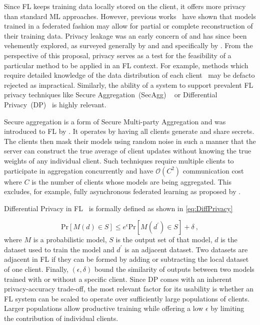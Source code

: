 Since FL keeps training data locally stored on the client, it offers more privacy than standard ML approaches. However, previous works~\citep{InvertingGradients,ProtectionAgainstReconstructionAndItsApplicationsInPrivateFL,PrivacyPreservingDLAdditivelyHomo,DeepLeakage} have shown that models trained in a federated fashion may allow for partial or complete reconstruction of their training data. Privacy leakage was an early concern of \citet{LearningDifferentiallyPrivateRNNs} and has since been vehemently explored, as surveyed generally by \citet{AdvancedAndOpenProblems} and \citet{ChallangesMethodsFutureDirections} and specifically by \citet{AcomprehensiveSurveyOFPrivacyPreservingFL}.
From the perspective of this proposal, privacy serves as a test for the feasibility of a particular method to be applied in an FL context. For example, methods which require detailed knowledge of the data distribution of each client~\citep{FLwithNonIID, OptimalUserEdgeAssingmentHierFL,FedHOME,CommEffDistillation} may be defacto rejected as impractical. Similarly, the ability of a system to support prevalent FL privacy techniques like Secure Aggregation~(SecAgg) ~\citep{SecAggOG,FastSecAgg,LightSecAgg} or Differential Privacy~(DP)~\citep{DiffPrivacyOriginal,DiffPrivacyFL,LearningDifferentiallyPrivateRNNs,TowardsFairPrivacyPreservingFL,PracticalPrivateFLkairouz21b} is highly relevant.


Secure aggregation is a form of Secure Multi-party Aggregation and was introduced to FL by \citet{SecAggOG}. It operates by having all clients generate and share secrets. The clients then mask their models using random noise in such a manner that the server can construct the true average of client updates without knowing the true weights of any individual client. Such techniques require multiple clients to participate in aggregation concurrently and have $\mathcal{O}(C^2)$ communication cost where $C$ is the number of clients whose models are being aggregated. This excludes, for example, fully asynchronous federated learning as proposed by \citet{AsyncFedOpt}.

Differential Privacy in FL~\citep{LearningDifferentiallyPrivateRNNs} is formally defined as shown in \cref{eq:DiffPrivacy}

\begin{equation}\label{eq:DiffPrivacy}
    \mathrm{Pr}[M(d) \in S] \leq e^\epsilon \mathrm{Pr}[M(d^\prime) \in S] + \delta \ ,
\end{equation}
where $M$ is a probabilistic model, $S$ is the output set of that model, $d$ is the dataset used to train the model and $d^\prime$ is an adjacent dataset. Two datasets are adjacent in FL if they can be formed by adding or subtracting the local dataset of one client.  Finally, $(\epsilon,\delta)$ bound the similarity of outputs between two models trained with or without a specific client. Since DP comes with an inherent privacy-accuracy trade-off, the most relevant factor for its usability is whether an FL system can be scaled to operate over sufficiently large populations of clients. Larger populations allow productive training while offering a low $\epsilon$ by limiting the contribution of individual clients.

